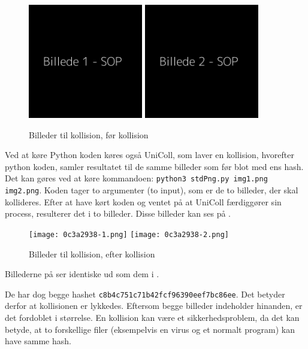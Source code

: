 \documentclass[12pt]{article}
\begin{document}
\begin{figure}[!h]
    \centering
    \includegraphics[width=5cm]{no.png}
    \qquad
    \includegraphics[width=5cm]{yes.png}
    \caption{Billeder til kollision, før kollision}
    \label{fig:coll-before}
\end{figure}

Ved at køre Python koden køres også UniColl, som laver en kollision, hvorefter python koden, samler resultatet til de samme billeder som før blot med ens hash. Det kan gøres ved at køre kommandoen: \verb|python3 stdPng.py img1.png img2.png|. Koden tager to argumenter (to input), som er de to billeder, der skal kollideres. Efter at have kørt koden og ventet på at UniColl færdiggører sin process, resulterer det i to billeder. Disse billeder kan ses på \figureautorefname{~\ref{fig:coll-after}}.

\begin{figure}[!h]
    \centering
    \texttt{[image: 0c3a2938-1.png]}
    \qquad
    \texttt{[image: 0c3a2938-2.png]}
    \caption{Billeder til kollision, efter kollision}
    \label{fig:coll-after}
\end{figure}

Billederne på \figureautorefname{~\ref{fig:coll-after}} ser identiske ud som dem i \figureautorefname{~\ref{fig:coll-before}}. 

De har dog begge hashet \verb|c8b4c751c71b42fcf96390eef7bc86ee|.
Det betyder derfor at kollisionen er lykkedes. Eftersom begge billeder indeholder hinanden, er det fordoblet i størrelse. En kollision kan være et sikkerhedsproblem, da det kan betyde, at to forskellige filer (eksempelvis en virus og et normalt program) kan have samme hash.
\end{document}
